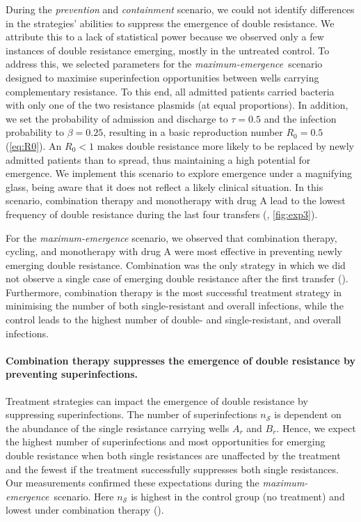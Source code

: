 During the \textit{prevention} and \textit{containment} scenario, we could not identify differences in the strategies' abilities to suppress the emergence of double resistance.
We attribute this to a lack of statistical power because we observed only a few instances of double resistance emerging, mostly in the untreated control.
To address this, we selected parameters for the \textit{maximum-emergence}~scenario designed to maximise superinfection opportunities between wells carrying complementary resistance.
To this end, all admitted patients carried bacteria with only one of the two resistance plasmids (at equal proportions).
In addition, we set the probability of admission and discharge to $\tau = 0.5$ and the infection probability to $\beta = 0.25$, resulting in a basic reproduction number $R_0 = 0.5$ (\autoref{eq:R0}).
An $R_0<1$ makes double resistance more likely to be replaced by newly admitted patients than to spread, thus maintaining a high potential for emergence.
We implement this scenario to explore emergence under a magnifying glass, being aware that it does not reflect a likely clinical situation. In this scenario, combination therapy and monotherapy with drug A lead to the lowest frequency of double resistance during the last four transfers (, \autoref{fig:exp3}).

For the \textit{maximum-emergence} scenario, we observed that combination therapy, cycling, and monotherapy with drug A were most effective in preventing newly emerging double resistance.
Combination was the only strategy in which we did not observe a single case of emerging double resistance after the first transfer ().
Furthermore, combination therapy is the most successful treatment strategy in minimising the number of both single-resistant and overall infections, while the control leads to the highest number of double- and single-resistant, and overall infections.

\paragraph{Combination therapy suppresses the emergence of double resistance by preventing superinfections.}
Treatment strategies can impact the emergence of double resistance by suppressing superinfections.
The number of superinfections $n_{\mathcal{S}}$ is dependent on the abundance of the single resistance carrying wells $A_r$ and $B_r$.
Hence, we expect the highest number of superinfections and most opportunities for emerging double resistance when both single resistances are unaffected by the treatment and the fewest if the treatment successfully suppresses both single resistances.
Our measurements confirmed these expectations during the \textit{maximum-emergence}~scenario.
Here $n_{\mathcal{S}}$ is highest in the control group (no treatment) and lowest under combination therapy ().

